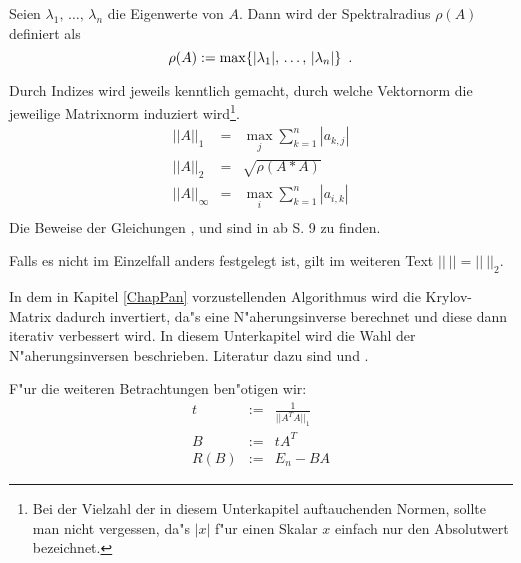 Seien $\lambda_1, \, \ldots, \, \lambda_n$ die Eigenwerte von $A$. Dann
wird der Spektralradius  $\rho(A)$ definiert als
\[ \rho(A) := \max\{ |\lambda_1|,\, \ldots,\, |\lambda_n| \} \mbox{\hspace{0.5em}.} \]

Durch
Indizes wird jeweils kenntlich gemacht, durch welche
Vektornorm die jeweilige Matrixnorm induziert wird\footnote{Bei der
Vielzahl der in diesem Unterkapitel auftauchenden Normen, sollte man
nicht vergessen, da"s $|x|$ f"ur einen Skalar $x$ einfach nur den
Absolutwert bezeichnet.}.
\begin{eqnarray}
    ||A||_1 & = & \max_j\sum_{k=1}^n |a_{k,j}| \label{EquMatNormEins} \\
    ||A||_2 & = & \sqrt{\rho(A * A)} \label{EquMatNormZwei} \\
    ||A||_\infty & = & \max_i\sum_{k=1}^n |a_{i,k}| 
                                              \label{EquMatNormInfty} \\
\end{eqnarray}
Die Beweise der Gleichungen ,
 und  sind in
\cite{Isaa73} ab S. 9 zu finden.

Falls es nicht im Einzelfall anders festgelegt ist, gilt im weiteren 
Text $||\:||=||\:||_2$.

%      


\label{SecGuessInverse}
 

In dem in Kapitel \ref{ChapPan} vorzustellenden Algorithmus wird die
Krylov-Matrix dadurch invertiert, da"s eine N"aherungsinverse berechnet
und diese dann iterativ verbessert wird. In diesem Unterkapitel
wird die Wahl der N"aherungsinversen beschrieben.
Literatur dazu sind \cite{PR85} und \cite{PR85a}.

F"ur die weiteren Betrachtungen ben"otigen wir:
\begin{eqnarray}
    t & := & \frac{1}{ ||A^TA||_1 } \label{EquPanDefT} \\
    B & := & t A^T \label{EquPanDefB} \\
    R(B) & := & E_n - B A \label{EquDefResidual} 
\end{eqnarray}

